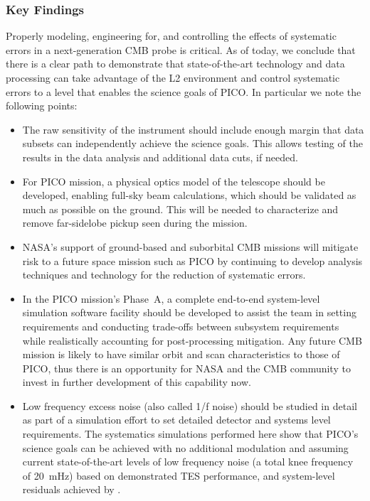 \documentclass[PICOReport.tex]{subfiles}
\begin{document}
\subsubsection{Key Findings}
\label{sec:systematics_key}

Properly modeling, engineering for, and controlling the effects of systematic errors in a
next-generation CMB probe is critical.  As of today, we conclude that there is a clear path to demonstrate that state-of-the-art technology and data processing can take advantage of the L2 environment and control systematic errors to a level that enables the science goals of PICO. In particular we note the following points:
\begin{itemize}
\item The raw sensitivity of the instrument should include enough margin
that data subsets can independently achieve the science goals.
This allows testing of the results in the data analysis and additional
data cuts, if needed.
\item For PICO mission, a physical optics model of the telescope should be developed, enabling full-sky beam calculations, which should be validated as much as possible on the ground.  This will be needed to characterize and remove far-sidelobe pickup seen during the mission. 
\item NASA's support of ground-based and suborbital CMB missions will mitigate risk to a future space mission such as PICO by continuing to develop analysis techniques and technology for the reduction of systematic errors.

\item In the PICO mission's Phase~A, a complete end-to-end system-level
simulation software facility should be developed to assist the team in setting 
requirements and conducting trade-offs between subsystem requirements while
realistically accounting for post-processing mitigation.  Any future
CMB mission is likely to have similar orbit  
and scan characteristics to those of PICO, thus there is an opportunity for NASA and
the CMB community to invest in further development of this capability now.
\item Low frequency excess noise (also called 1/f noise) should be studied in detail as part of a simulation effort to set detailed detector and systems level requirements.  The systematics simulations performed here show that PICO's science goals can be achieved with no additional modulation and assuming current state-of-the-art levels of low frequency noise (a total knee frequency of 20~mHz) based on demonstrated TES performance, and system-level residuals achieved by \planck.
\end{itemize}
\end{document}
